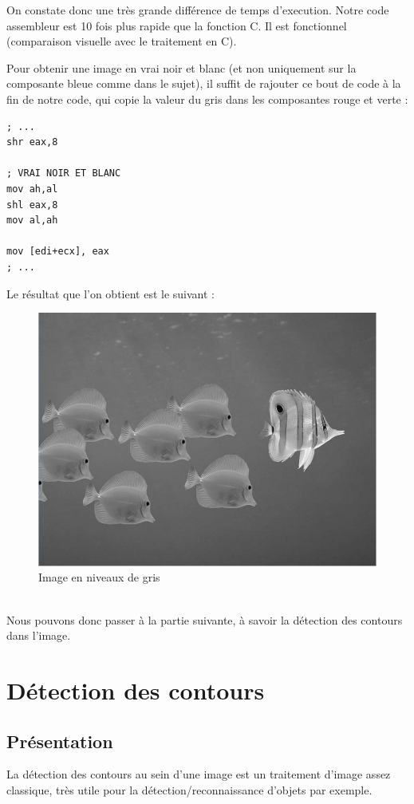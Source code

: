 On constate donc une très grande différence de temps d'execution. Notre code assembleur est 10 fois plus rapide que la fonction C. Il est fonctionnel (comparaison visuelle avec le traitement en C).

\medskip

Pour obtenir une image en vrai noir et blanc (et non uniquement sur la composante bleue comme dans le sujet), il suffit de rajouter ce bout de code à la fin de notre code, qui copie la valeur du gris dans les composantes rouge et verte :
\begin{lstlisting}
; ...
shr eax,8

; VRAI NOIR ET BLANC
mov ah,al
shl eax,8
mov al,ah

mov [edi+ecx], eax
; ...
\end{lstlisting}
Le résultat que l'on obtient est le suivant :
\begin{figure}[!h]
   \centering\includegraphics[width=\textwidth]{img/niveaux_gris.png}
   \caption{Image en niveaux de gris}
\end{figure}
\\
Nous pouvons donc passer à la partie suivante, à savoir la détection des contours dans l'image.

\chapter{Détection des contours}
\section{Présentation}
La détection des contours au sein d'une image est un traitement d'image assez classique, très utile pour la détection/reconnaissance d'objets par exemple.


